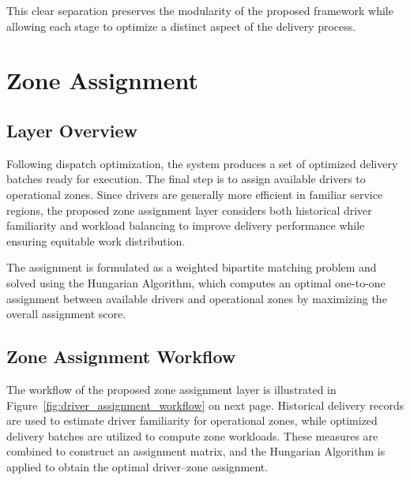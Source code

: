 \documentclass{article}
\begin{document}
This clear separation preserves the modularity of the proposed framework while allowing each stage to optimize a distinct aspect of the delivery process.

\newpage
\section{Zone Assignment}

\subsection{Layer Overview}
Following dispatch optimization, the system produces a set of optimized delivery batches ready for execution. The final step is to assign available drivers to operational zones. Since drivers are generally more efficient in familiar service regions, the proposed zone assignment layer considers both historical driver familiarity and workload balancing to improve delivery performance while ensuring equitable work distribution.

The assignment is formulated as a weighted bipartite matching problem and solved using the Hungarian Algorithm, which computes an optimal one-to-one assignment between available drivers and operational zones by maximizing the overall assignment score.

\subsection{Zone Assignment Workflow}
The workflow of the proposed zone assignment layer is illustrated in Figure~\ref{fig:driver_assignment_workflow} on next page. Historical delivery records are used to estimate driver familiarity for operational zones, while optimized delivery batches are utilized to compute zone workloads. These measures are combined to construct an assignment matrix, and the Hungarian Algorithm is applied to obtain the optimal driver–zone assignment.
\end{document}
